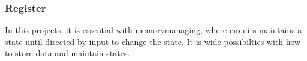 \subsubsection{Register} \label{Register}
In this projects, it is essential with memorymanaging, where circuits maintains a state until directed by input to change the state. It is wide possibilties with how to store data and maintain states.
